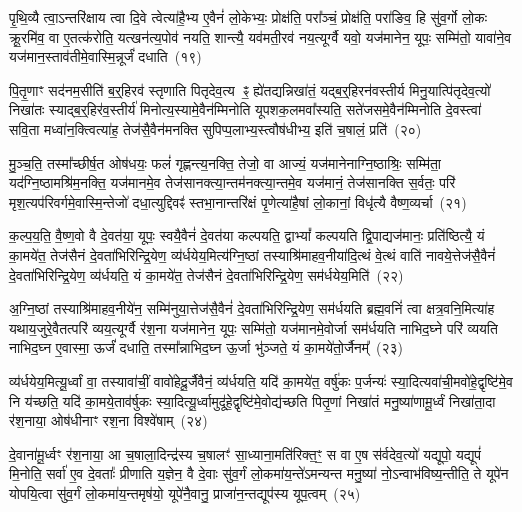 {\anuvakamend[{जु॒षे॒ सते॑जस॒मन॑क्षसङ्गं बहुशा॒खं वृ॑श्चेदे॒ष वै य॒ज्ञ उपै॑न॒मुत्त॑रो य॒ज्ञ आप्त्या॒ एका॒न्नविꣳ॑श॒तिश्च॑}]}

पृ॒थि॒व्यै त्वा॒ऽन्तरि॑क्षाय त्वा दि॒वे त्वेत्या॑है॒भ्य ए॒वैनं॑ लो॒केभ्यः॒ प्रोक्ष॑ति॒ परा᳚ञ्चं॒ प्रोक्ष॑ति॒ परा॑ङिव॒ हि सु॑व॒र्गो लो॒कः क्रू॒रमि॑व॒ वा ए॒तत्क॑रोति॒ यत्खन॑त्य॒पोव॑ नयति॒ शान्त्यै॒ यव॑मती॒रव॑ नय॒त्यूर्ग्वै यवो॒ यज॑मानेन॒ यूपः॒ सम्मि॑तो॒ यावा॑ने॒व यज॑मान॒स्ताव॑तीमे॒वास्मि॒न्नूर्जं॑ दधाति~(१९)\ip

पि॒तृ॒णाꣳ सद॑नम॒सीति॑ ब॒र्॒\mbox{}हिरव॑ स्तृणाति पितृदेव॒त्य ꣴ॒ ह्ये॑तद्यन्निखा॑तं॒ यद्ब॒र्॒\mbox{}हिरन॑वस्तीर्य मिनु॒यात्पि॑तृदेव॒त्यो॑ निखा॑तः स्याद्ब॒र्॒\mbox{}हिर॑व॒स्तीर्य॑ मिनोत्य॒स्यामे॒वैन॑म्मिनोति यूपशक॒लमवा᳚स्यति॒ सते॑जसमे॒वैन॑म्मिनोति दे॒वस्त्वा॑ सवि॒ता मध्वा॑न॒क्त्वित्या॑ह॒ तेज॑सै॒वैन॑मनक्ति सुपिप्प॒लाभ्य॒स्त्वौष॑धीभ्य॒ इति॑ च॒षालं॒ प्रति॑~(२०)\ip

मु॒ञ्च॒ति॒ तस्मा᳚च्छीर्\mbox{}ष॒त ओष॑धयः॒ फलं॑ गृह्णन्त्य॒नक्ति॒ तेजो॒ वा आज्यं॒ यज॑मानेनाग्नि॒ष्ठाश्रिः॒ सम्मि॑ता॒ यद॑ग्नि॒ष्ठा\-मश्रि॑म॒नक्ति॒ यज॑मानमे॒व तेज॑सानक्त्या॒न्तम॑नक्त्या॒न्तमे॒व यज॑मानं॒ तेज॑सानक्ति स॒र्वतः॒ परि॑ मृश॒त्यप॑रिवर्गमे॒वा\-स्मि॒न्तेजो॑ दधा॒त्युद्दिवꣴ॑ स्तभा॒नान्तरि॑क्षं पृ॒णेत्या॑है॒षां लो॒कानां॒ विधृ॑त्यै वैष्ण॒व्यर्चा~(२१)\ip

क॒ल्प॒य॒ति॒ वै॒ष्ण॒वो वै दे॒वत॑या॒ यूपः॒ स्वयै॒वैनं॑ दे॒वत॑या कल्पयति॒ द्वा\-भ्यां᳚ कल्पयति द्वि॒पाद्यज॑मानः॒ प्रति॑ष्ठित्यै॒ यं का॒मये॑त॒ तेज॑सैनं दे॒वता॑भिरिन्द्रि॒येण॒ व्य॑र्धयेय॒मित्य॑ग्नि॒ष्ठां तस्याश्रि॑माहव॒नीया॑दि॒त्थं वे॒त्थं वाति॑ नावये॒त्तेज॑सै॒वैनं॑ दे॒वता॑भिरिन्द्रि॒येण॒ व्य॑र्धयति॒ यं का॒मये॑त॒ तेज॑सैनं दे॒वता॑भिरिन्द्रि॒येण॒ सम॑र्धयेय॒मिति॑~(२२)\ip

अ॒ग्नि॒ष्ठां तस्याश्रि॑माहव॒नीये॑न॒ सम्मि॑नुया॒त्तेज॑सै॒वैनं॑ दे॒वता॑भिरिन्द्रि॒येण॒ सम॑र्धयति ब्रह्म॒वनिं॑ त्वा क्षत्र॒वनि॒मित्या॑ह यथाय॒जुरे॒वैतत्परि॑ व्यय॒त्यूर्ग्वै र॑श॒ना यज॑मानेन॒ यूपः॒ सम्मि॑तो॒ यज॑मानमे॒वोर्जा सम॑र्धयति नाभिद॒घ्ने परि॑ व्ययति नाभिद॒घ्न ए॒वास्मा॒ ऊर्जं॑ दधाति॒ तस्मा᳚न्नाभिद॒घ्न ऊ॒र्जा भु॑ञ्जते॒ यं का॒मये॑तो॒र्जैनम्᳚~(२३)\ip

व्य॑र्धयेय॒मित्यू॒र्ध्वां वा॒ तस्यावा॑चीं॒ वावो॑हेदू॒र्जैवैनं॒ व्य॑र्धयति॒ यदि॑ का॒मये॑त॒ वर्\mbox{}षु॑कः प॒र्जन्यः॑ स्या॒दित्यवा॑ची॒मवो॑हे॒\-द्वृष्टि॑मे॒व नि य॑च्छति॒ यदि॑ का॒मये॒ताव॑र्\mbox{}षुकः स्या॒दित्यू॒र्ध्वामुदू॑हे॒द्वृष्टि॑मे॒वोद्य॑च्छति पितृ॒णां निखा॑तं मनु॒ष्या॑णामू॒र्ध्वं निखा॑ता॒दा र॑श॒नाया॒ ओष॑धीनाꣳ रश॒ना विश्वे॑षाम्~(२४)\ip

दे॒वाना॑मू॒र्ध्वꣳ र॑श॒नाया॒ आ च॒षाला॒दिन्द्र॑स्य च॒षालꣳ॑ सा॒ध्याना॒मति॑रिक्त॒ꣳ॒ स वा ए॒ष स॑र्वदेव॒त्यो॑ यद्यूपो॒ यद्यूपं॑ मि॒नोति॒ सर्वा॑ ए॒व दे॒वताः᳚ प्रीणाति य॒ज्ञेन॒ वै दे॒वाः सु॑व॒र्गं लो॒कमा॑य॒न्ते॑\-ऽमन्यन्त मनु॒ष्या॑ नो॒\-ऽन्वाभ॑विष्य॒न्तीति॒ ते यूपे॑न योपयि॒त्वा सु॑व॒र्गं लो॒कमा॑य॒न्तमृष॑यो॒ यूपे॑नै॒वानु॒ प्राजा॑न॒न्तद्यूप॑स्य यूप॒त्वम्~(२५)\ip

